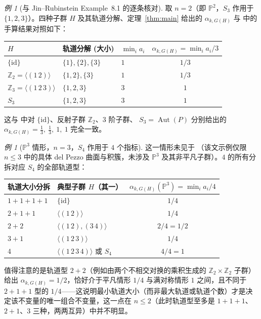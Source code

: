 \documentclass[11pt,a4paper]{article}
\theoremstyle{definition}
\theoremstyle{remark}
\newtheorem{example}[theorem]{例}
\DeclareMathOperator{\Aut}{Aut}
\newcommand{\PP}{\mathbb{P}}
\begin{document}
\begin{example}[与 Jin--Rubinstein Example~8.1 的逐条核对]\label{ex:check}
取 $n=2$（即 $\PP^2$，$S_3$ 作用于 $\{1,2,3\}$）。四种子群 $H$ 及其轨道分解、定理~\ref{thm:main}
给出的 $\alpha_{k,G(H)}$ 与 \cite[Example~8.1]{JR2025} 中的手算结果对照如下：

\begin{center}
\begin{tabular}{@{}lllc@{}}
\toprule
$H$ & 轨道分解 (大小) & $\min_i a_i$ & $\alpha_{k,G(H)} = \min_i a_i / 3$ \\
\midrule
$\{\mathrm{id}\}$ & $\{1\},\{2\},\{3\}$ & $1$ & $1/3$ \\
$\mathbb{Z}_2 = \langle(1\,2)\rangle$ & $\{1,2\},\{3\}$ & $1$ & $1/3$ \\
$\mathbb{Z}_3 = \langle(1\,2\,3)\rangle$ & $\{1,2,3\}$ & $3$ & $1$ \\
$S_3$ & $\{1,2,3\}$ & $3$ & $1$ \\
\bottomrule
\end{tabular}
\end{center}

这与 \cite[Example~8.1]{JR2025} 中对 $\{\mathrm{id}\}$、反射子群 $\mathbb{Z}_2$、$3$ 阶子群、
$S_3 = \Aut(P)$ 分别给出的 $\alpha_{k,G(H)} = \tfrac13,\ \tfrac13,\ 1,\ 1$ 完全一致。
\end{example}

\begin{example}[$\PP^3$ 情形，$n=3$，$S_4$ 作用于 $4$ 个指标]
这一情形未见于 \cite{JR2025}（该文示例仅限 $n \le 3$ 中的具体 del Pezzo 曲面与积簇，未涉及
$\PP^3$ 及其非平凡子群）。$4$ 的所有分拆对应 $S_4$ 的全部轨道型：

\begin{center}
\begin{tabular}{@{}llc@{}}
\toprule
轨道大小分拆 & 典型子群 $H$（其一） & $\alpha_{k,G(H)}(\PP^3) = \min_i a_i / 4$ \\
\midrule
$1+1+1+1$ & $\{\mathrm{id}\}$ & $1/4$ \\
$2+1+1$ & $\langle(1\,2)\rangle$ & $1/4$ \\
$2+2$ & $\langle(1\,2),(3\,4)\rangle$ & $2/4 = 1/2$ \\
$3+1$ & $\langle(1\,2\,3)\rangle$ & $1/4$ \\
$4$ & $\langle(1\,2\,3\,4)\rangle$ 或 $S_4$ & $4/4 = 1$ \\
\bottomrule
\end{tabular}
\end{center}

值得注意的是轨道型 $2+2$（例如由两个不相交对换的乘积生成的 $\mathbb{Z}_2 \times \mathbb{Z}_2$ 子群）
给出 $\alpha_{k,G(H)} = 1/2$，恰好介于平凡情形 $1/4$ 与满对称情形 $1$ 之间，且不同于 $2+1+1$ 型的
$1/4$——这说明最小轨道大小（而非最大轨道或轨道个数）才是决定该不变量的唯一组合不变量，这一点在
$n \le 2$（此时轨道型至多是 $1+1+1$、$2+1$、$3$ 三种，两两互异）中并不明显。
\end{example}
\end{document}
